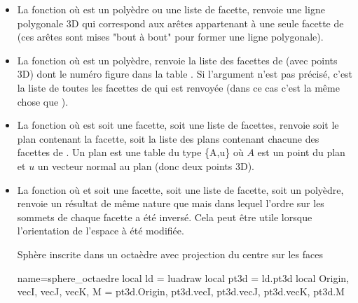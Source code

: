 \begin{itemize}
    \item La fonction  où  est un polyèdre ou une liste de facette, renvoie une ligne polygonale 3D qui correspond aux arêtes appartenant à une seule facette de  (ces arêtes sont mises "bout à bout" pour former une ligne polygonale).
    
    \item La fonction  où  est un polyèdre, renvoie la liste des facettes de  (avec points 3D) dont le numéro figure dans la table . Si l'argument  n'est pas précisé, c'est la liste de toutes les facettes de  qui est renvoyée (dans ce cas c'est la même chose que ).
    
    \item La fonction  où  est soit une facette, soit une liste de facettes, renvoie soit le plan contenant la facette, soit la liste des plans contenant chacune des facettes de . Un plan est une table du type \{A,u\} où $A$ est un point du plan et $u$ un vecteur normal au plan (donc deux points 3D).
    
    \item La fonction  où  et soit une facette, soit une liste de facette, soit un polyèdre, renvoie un résultat de même nature que  mais dans lequel l'ordre sur les sommets de chaque facette a été inversé. Cela peut être utile lorsque l'orientation de l'espace à été modifiée.
    
\begin{demo}{Sphère inscrite dans un octaèdre avec projection du centre sur les faces}
\begin{luadraw}{name=sphere_octaedre}
local ld = luadraw
local pt3d = ld.pt3d
local Origin, vecI, vecJ, vecK, M = pt3d.Origin, pt3d.vecI, pt3d.vecJ, pt3d.vecK, pt3d.M


\end{luadraw}
\end{demo}
\end{itemize}
